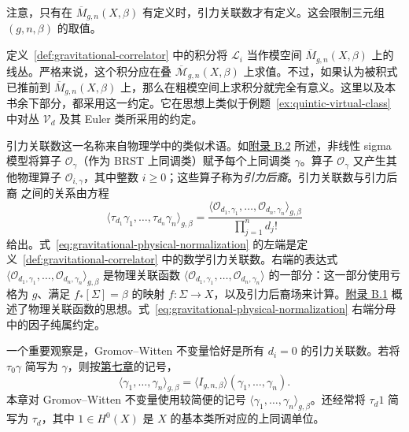 注意，只有在 $\overline M_{g,n}(X,\beta)$ 有定义时，引力关联数才有定义。这会限制三元组 $(g,n,\beta)$ 的取值。

定义~\ref{def:gravitational-correlator} 中的积分将 $\mathcal L_i$ 当作模空间 $\overline M_{g,n}(X,\beta)$ 上的线丛。严格来说，这个积分应在叠 $\overline{\mathcal M}_{g,n}(X,\beta)$ 上求值。不过，如果认为被积式已推前到 $\overline M_{g,n}(X,\beta)$ 上，那么在粗模空间上求积分就完全有意义。这里以及本书余下部分，都采用这一约定。它在思想上类似于例题~\ref{ex:quintic-virtual-class} 中对丛 $\mathcal V_d$ 及其 Euler 类所采用的约定。

引力关联数这一名称来自物理学中的类似术语。如\hyperref[sec:nonlinear-sigma-models]{附录 B.2} 所述，非线性 sigma 模型将算子 $\mathcal O_\gamma$（作为 BRST 上同调类）赋予每个上同调类 $\gamma$。算子 $\mathcal O_\gamma$ 又产生其他物理算子 $\mathcal O_{i,\gamma}$，其中整数 $i\ge0$；这些算子称为\emph{引力后裔}。引力关联数与引力后裔
之间的关系由方程
\begin{equation}\label{eq:gravitational-physical-normalization}
\langle\tau_{d_1}\gamma_1,\ldots,\tau_{d_n}\gamma_n\rangle_{g,\beta}
=\frac{\langle\mathcal O_{d_1,\gamma_1},\ldots,\mathcal O_{d_n,\gamma_n}\rangle_{g,\beta}}
{\prod_{j=1}^n d_j!}
\end{equation}
给出。式~\eqref{eq:gravitational-physical-normalization} 的左端是定义~\ref{def:gravitational-correlator} 中的数学引力关联数。右端的表达式 $\langle\mathcal O_{d_1,\gamma_1},\ldots,\mathcal O_{d_n,\gamma_n}\rangle_{g,\beta}$ 是物理关联函数 $\langle\mathcal O_{d_1,\gamma_1},\ldots,\mathcal O_{d_n,\gamma_n}\rangle$ 的一部分：这一部分使用亏格为 $g$、满足 $f_*[\Sigma]=\beta$ 的映射 $f:\Sigma\to X$，以及引力后裔场来计算。\hyperref[sec:general-field-theories]{附录 B.1} 概述了物理关联函数的思想。式~\eqref{eq:gravitational-physical-normalization} 右端分母中的因子纯属约定。

一个重要观察是，Gromov--Witten 不变量恰好是所有 $d_i=0$ 的引力关联数。若将 $\tau_0\gamma$ 简写为 $\gamma$，则按\hyperref[chap:gromov-witten]{第七章}的记号，
\[
\langle\gamma_1,\ldots,\gamma_n\rangle_{g,\beta}
=\langle I_{g,n,\beta}\rangle(\gamma_1,\ldots,\gamma_n).
\]
本章对 Gromov--Witten 不变量使用较简便的记号 $\langle\gamma_1,\ldots,\gamma_n\rangle_{g,\beta}$。还经常将 $\tau_d1$ 简写为 $\tau_d$，其中 $1\in H^0(X)$ 是 $X$ 的基本类所对应的上同调单位。

